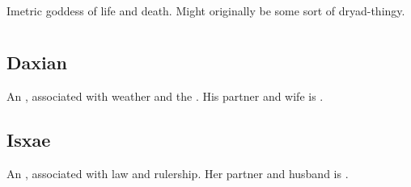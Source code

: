 \section{\NishiS}
\index{\NishiS}
Imetric goddess of life and death. 
Might originally be some sort of dryad-thingy. 






































\chapter{\Taorthae}















\section{Daxian}
An , associated with weather and the \Wylde{}. 
His partner and wife is . 















\section{Isxae}
An , associated with law and rulership. 
Her partner and husband is . 















